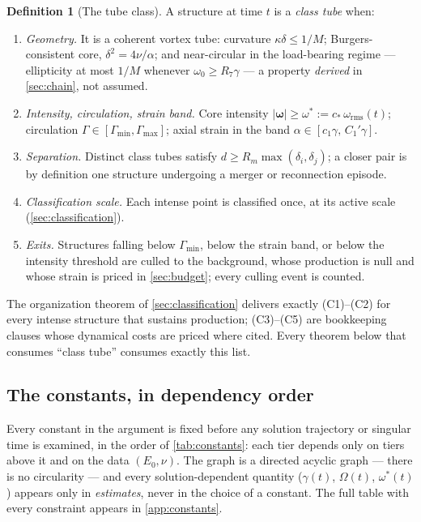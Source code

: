 \documentclass[11pt,letterpaper]{amsart}
\theoremstyle{definition}
\newtheorem{definition}[theorem]{Definition}
\theoremstyle{remark}
\newcommand{\om}{\omega}
\newcommand{\vort}{\boldsymbol{\omega}}
\newcommand{\abs}[1]{\lvert #1 \rvert}
\begin{document}
\begin{definition}[The tube class]\label{def:class}
A structure at time $t$ is a \emph{class tube} when:
\begin{enumerate}[label=\textup{(C\arabic*)},itemsep=2pt]
\item \emph{Geometry.} It is a coherent vortex tube: curvature $\kappa\delta\le1/M$;
Burgers-consistent core, $\delta^2=4\nu/\alpha$; and near-circular in the load-bearing
regime --- ellipticity at most $1/M$ whenever $\om_0\ge R_7\gamma$ --- a property
\emph{derived} in \cref{sec:chain}, not assumed.
\item \emph{Intensity, circulation, strain band.} Core intensity
$\abs{\vort}\ge\om^*:=c_*\,\om_{\mathrm{rms}}(t)$; circulation
$\Gamma\in[\Gamma_{\min},\Gamma_{\max}]$; axial strain in the band
$\alpha\in[c_1\gamma,\,C_1'\gamma]$.
\item \emph{Separation.} Distinct class tubes satisfy
$d\ge R_m\max(\delta_i,\delta_j)$; a closer pair is by definition one structure
undergoing a merger or reconnection episode.
\item \emph{Classification scale.} Each intense point is classified once, at its
active scale (\cref{sec:classification}).
\item \emph{Exits.} Structures falling below $\Gamma_{\min}$, below the strain band,
or below the intensity threshold are culled to the background, whose production is
null and whose strain is priced in \cref{sec:budget}; every culling event is counted.
\end{enumerate}
\end{definition}

The organization theorem of \cref{sec:classification} delivers exactly (C1)--(C2) for
every intense structure that sustains production; (C3)--(C5) are bookkeeping clauses
whose dynamical costs are priced where cited. Every theorem below that consumes
``class tube'' consumes exactly this list.

\subsection{The constants, in dependency order}\label{subsec:constants}
Every constant in the argument is fixed before any solution trajectory or singular
time is examined, in the order of \cref{tab:constants}: each tier depends only on
tiers above it and on the data $(E_0,\nu)$. The graph is a directed acyclic graph ---
there is no circularity --- and every solution-dependent quantity
($\gamma(t)$, $\Omega(t)$, $\om^*(t)$) appears only in \emph{estimates}, never in the
choice of a constant. The full table with every constraint appears in
\cref{app:constants}.
\end{document}
